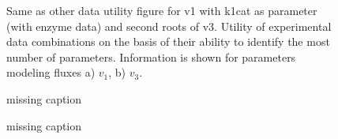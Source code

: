 \documentclass[10pt]{article}
\begin{document}
	\begin{figure}[!tbhp]
		\caption{Same as other data utility figure for v1 with k1cat as parameter (with enzyme data) and second roots of v3. Utility of experimental data combinations on the basis of their ability to identify the most number of parameters. Information is shown for parameters modeling fluxes a) $v_1$, b) $v_3$.}\label{fig:figure4s}
	\end{figure}	

	\begin{figure}[!tbhp]
		\caption{missing caption}%
	\end{figure} 

	\begin{figure}[!tbhp]
		\caption{missing caption}%
	\end{figure} 
\end{document}
